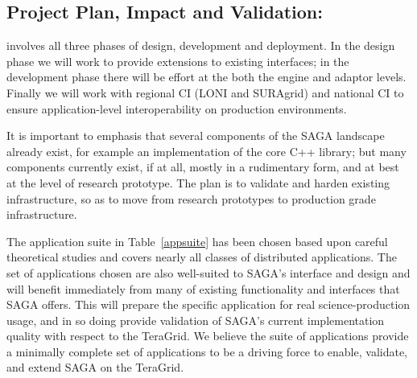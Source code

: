 \documentclass[10pt,letterpaper]{article}
\newcommand{\upp}{\vspace*{-0.5em}}
\begin{document}
\subsection*{Project Plan, Impact and Validation:}

 involves all three phases of design,
development and deployment. In the design phase we will work to
provide extensions to existing interfaces; in the development phase
there will be effort at the both the engine and adaptor
levels. Finally we will work with regional CI (LONI and SURAgrid) and
national CI to ensure application-level interoperability on production
environments.

It is important to emphasis that several components of the SAGA
landscape already exist, for example an
implementation of the core C++ library; but many components currently
exist, if at all, mostly in a rudimentary form, and at best at the
level of research prototype.  The plan is to validate and harden
existing infrastructure, so as to move from research prototypes to
production grade infrastructure.



 The application
suite in Table~\ref{appsuite} has been chosen based upon careful
theoretical studies and covers nearly all classes of distributed
applications. The set of applications chosen are also well-suited to
SAGA's interface and design and will benefit immediately from many of
existing functionality and interfaces that SAGA offers. This will
prepare the specific application for real science-production usage,
and in so doing provide validation of SAGA's current implementation
quality with respect to the TeraGrid. We believe the suite of
applications provide a minimally complete set of applications to be a
driving force to enable, validate, and extend SAGA on the TeraGrid.
\end{document}
